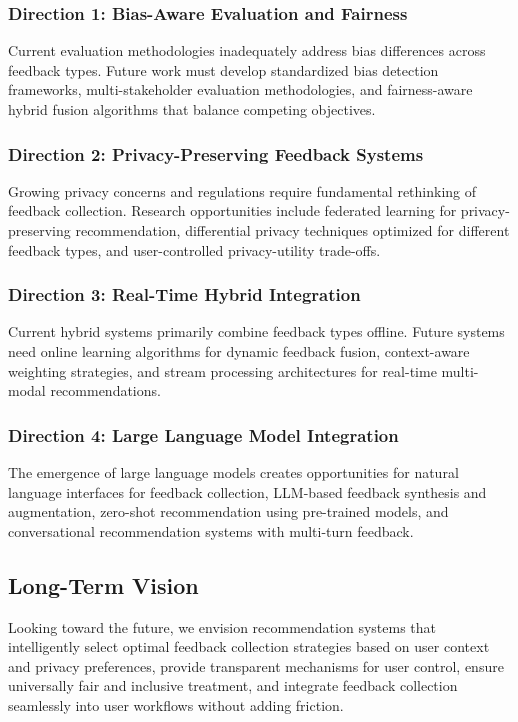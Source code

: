 \subsubsection{Direction 1: Bias-Aware Evaluation and Fairness}

Current evaluation methodologies inadequately address bias differences across feedback types. Future work must develop standardized bias detection frameworks, multi-stakeholder evaluation methodologies, and fairness-aware hybrid fusion algorithms that balance competing objectives.

\subsubsection{Direction 2: Privacy-Preserving Feedback Systems}

Growing privacy concerns and regulations require fundamental rethinking of feedback collection. Research opportunities include federated learning for privacy-preserving recommendation, differential privacy techniques optimized for different feedback types, and user-controlled privacy-utility trade-offs.

\subsubsection{Direction 3: Real-Time Hybrid Integration}

Current hybrid systems primarily combine feedback types offline. Future systems need online learning algorithms for dynamic feedback fusion, context-aware weighting strategies, and stream processing architectures for real-time multi-modal recommendations.

\subsubsection{Direction 4: Large Language Model Integration}

The emergence of large language models creates opportunities for natural language interfaces for feedback collection, LLM-based feedback synthesis and augmentation, zero-shot recommendation using pre-trained models, and conversational recommendation systems with multi-turn feedback.

\subsection{Long-Term Vision}

Looking toward the future, we envision recommendation systems that intelligently select optimal feedback collection strategies based on user context and privacy preferences, provide transparent mechanisms for user control, ensure universally fair and inclusive treatment, and integrate feedback collection seamlessly into user workflows without adding friction.

